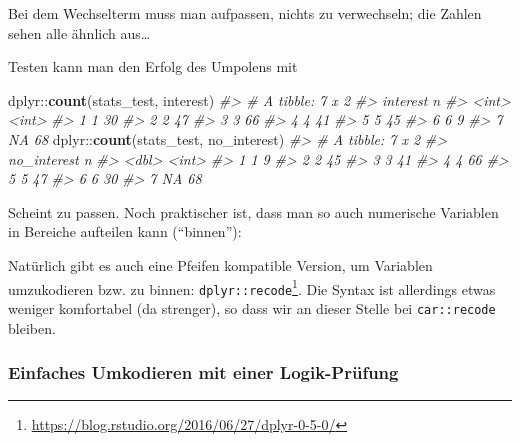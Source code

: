 \documentclass[12pt,ngerman,]{book}
\makeatletter
\newenvironment{Shaded}{\begin{snugshade}}{\end{snugshade}}
\newcommand{\KeywordTok}[1]{\textcolor[rgb]{0.13,0.29,0.53}{\textbf{{#1}}}}
\newcommand{\StringTok}[1]{\textcolor[rgb]{0.31,0.60,0.02}{{#1}}}
\newcommand{\CommentTok}[1]{\textcolor[rgb]{0.56,0.35,0.01}{\textit{{#1}}}}
\newcommand{\NormalTok}[1]{{#1}}
\let\rmarkdownfootnote\footnote%
\def\footnote{\protect\rmarkdownfootnote}
\newenvironment{kframe}{%
\medskip{}
\setlength{\fboxsep}{.8em}
 \def\at@end@of@kframe{}%
 \ifinner\ifhmode%
  \def\at@end@of@kframe{\end{minipage}}%
  \begin{minipage}{\columnwidth}%
 \fi\fi%
 \def\FrameCommand##1{\hskip\@totalleftmargin \hskip-\fboxsep
 \colorbox{shadecolor}{##1}\hskip-\fboxsep
     \hskip-\linewidth \hskip-\@totalleftmargin \hskip\columnwidth}%
 \MakeFramed {\advance\hsize-\width
   \@totalleftmargin\z@ \linewidth\hsize
   \@setminipage}}%
 {\par\unskip\endMakeFramed%
 \at@end@of@kframe}
\renewenvironment{Shaded}{\begin{kframe}}{\end{kframe}}
\makeatother
\begin{document}
Bei dem Wechselterm muss man aufpassen, nichts zu verwechseln; die
Zahlen sehen alle ähnlich aus\ldots{}

Testen kann man den Erfolg des Umpolens mit

\begin{Shaded}
\begin{Highlighting}[]
\NormalTok{dplyr::}\KeywordTok{count}\NormalTok{(stats_test, interest)}
\CommentTok{#> # A tibble: 7 x 2}
\CommentTok{#>   interest     n}
\CommentTok{#>      <int> <int>}
\CommentTok{#> 1        1    30}
\CommentTok{#> 2        2    47}
\CommentTok{#> 3        3    66}
\CommentTok{#> 4        4    41}
\CommentTok{#> 5        5    45}
\CommentTok{#> 6        6     9}
\CommentTok{#> 7       NA    68}
\NormalTok{dplyr::}\KeywordTok{count}\NormalTok{(stats_test, no_interest)}
\CommentTok{#> # A tibble: 7 x 2}
\CommentTok{#>   no_interest     n}
\CommentTok{#>         <dbl> <int>}
\CommentTok{#> 1           1     9}
\CommentTok{#> 2           2    45}
\CommentTok{#> 3           3    41}
\CommentTok{#> 4           4    66}
\CommentTok{#> 5           5    47}
\CommentTok{#> 6           6    30}
\CommentTok{#> 7          NA    68}
\end{Highlighting}
\end{Shaded}

Scheint zu passen. Noch praktischer ist, dass man so auch numerische
Variablen in Bereiche aufteilen kann (``binnen''):

\begin{Shaded}
\end{Shaded}

Natürlich gibt es auch eine Pfeifen kompatible Version, um Variablen
umzukodieren bzw. zu binnen: \texttt{dplyr::recode}\footnote{\url{https://blog.rstudio.org/2016/06/27/dplyr-0-5-0/}}.
Die Syntax ist allerdings etwas weniger komfortabel (da strenger), so
dass wir an dieser Stelle bei \texttt{car::recode} bleiben.

\subsubsection{Einfaches Umkodieren mit einer
Logik-Prüfung}\label{einfaches-umkodieren-mit-einer-logik-prufung}
\end{document}
